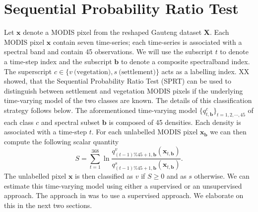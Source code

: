 \documentclass{article}
\begin{document}
\section{Sequential Probability Ratio Test}
Let $\mathbf{x}$ denote a MODIS pixel from the reshaped Gauteng dataset $\mathbf{X}$. Each MODIS pixel $\mathbf{x}$ contain seven time-series; each time-series is associated with a spectral band and contain 45 observations.
We will use the subscript $t$ to denote a time-step index and the subscript $\mathbf{b}$ to denote a composite spectralband index. The superscript $c\in\{v~\textrm{(vegetation)},s~\textrm{(settlement)}\}$ acts as a labelling index. XX showed, that the Sequential Probability Ratio Test (SPRT) can be used to distinguish between settlement and vegetation MODIS pixels if the underlying time-varying model of the two classes are known. The details of this classification strategy follows below. The aforementioned time-varying model $\{q_{t,\mathbf{b}}^c\}_{t=1,2,\cdots,45}$ of each class $c$ and spectral subset $\mathbf{b}$ is composed of 45 densities. Each density is associated with a time-step $t$. 
For each unlabelled MODIS pixel $\mathbf{x}_{\mathbf{b}}$ we can then compute the following scalar quantity 
\begin{equation}
S = \sum_{t=1}^{368} \ln \frac{q_{(t-1)\%45+1,\mathbf{b}}^v(\mathbf{x}_{t,\mathbf{b}})}{q_{(t-1)\%45+1,\mathbf{b}}^s(\mathbf{x}_{t,\mathbf{b}})}. 
\end{equation}
The unlabelled pixel $\mathbf{x}$ is then classified as $v$ if $S\geq 0$ and as $s$ otherwise. We can estimate this time-varying model using either a supervised or an unsupervised 
approach. The approach in was to use a supervised approach. We elaborate on this in the next two sections.
\end{document}
